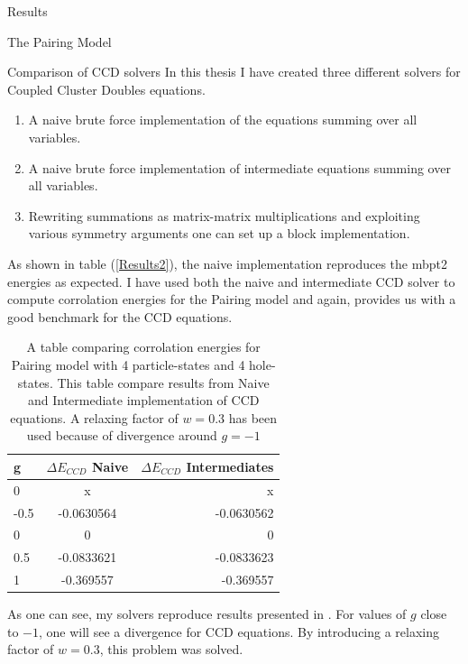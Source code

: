 \documentclass[twoside,english]{uiofysmaster}
\begin{document}
\begin{chapter}{Results}
\begin{section}{The Pairing Model}
		\begin{subsection}{Comparison of CCD solvers}
			In this thesis I have created three different solvers for Coupled Cluster Doubles equations. 
			\begin{enumerate}
				\item A naive brute force implementation of the equations summing over all variables. 
				\item A naive brute force implementation of intermediate equations summing over all variables.
				\item Rewriting summations as matrix-matrix multiplications and exploiting various symmetry arguments one can set up a block implementation.
			\end{enumerate}		
			As shown in table (\ref{Results2}), the naive implementation reproduces the mbpt2 energies as expected. I have used both the naive and intermediate CCD solver to compute corrolation energies for the Pairing model and again, \cite{Hjorth-Jensen2016} provides us with a good benchmark for the CCD equations.

			\begin{table}
				\begin{center}
					\begin{tabular}[center]{l | c | r}
						g & $ \Delta E_{CCD}$ Naive  & $\Delta E_{CCD}$ Intermediates \\
						\hline
						0 & x & x \\
						-0.5 & -0.0630564 & -0.0630562 \\
						0 & 0 & 0 \\
						0.5 & -0.0833621 & -0.0833623 \\
						1 & -0.369557 & -0.369557
					\end{tabular}
				\end{center}
				\caption{A table comparing corrolation energies for Pairing model with 4 particle-states and 4 hole-states. This table compare results from Naive and Intermediate implementation of CCD equations. A relaxing factor of $w = 0.3$ has been used because of divergence around $g=-1$}
				\label{Results3}
			\end{table}
			As one can see, my solvers reproduce results presented in \cite{Hjorth-Jensen2016}. For values of $g$ close to $-1$, one will see a divergence for CCD equations. By introducing a relaxing factor of $w = 0.3$, this problem was solved. 
  

\end{subsection}
\end{section}
\end{chapter}
\end{document}
